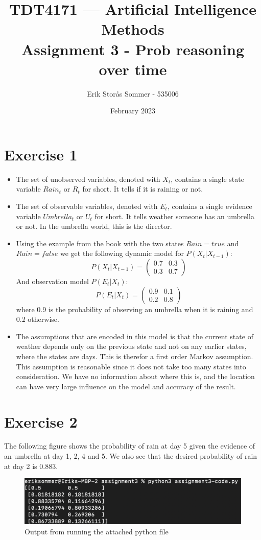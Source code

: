 \documentclass{article}
\title{TDT4171 — Artificial Intelligence Methods \\ Assignment 3 - Prob reasoning over time}
\author{Erik Storås Sommer - 535006}
\date{February 2023}
\begin{document}
\maketitle

\section*{Exercise 1}

\begin{itemize}
  \item The set of unobserved variables, denoted with \(X_t\), contains a single state variable \(Rain_t\) or \(R_t\) for short. It tells if it is raining or not.
  \item The set of observable variables, denoted with \(E_t\), contains a single evidence variable \(Umbrella_t\) or \(U_t\) for short. It tells weather someone has an umbrella or not. In the umbrella world, this is the director.
  \item Using the example from the book with the two states \(Rain=true\) and \(Rain=false\) we get the following dynamic model for \(P(X_t|X_{t-1})\):
  \[P(X_t|X_{t-1})= \begin{pmatrix} 0.7 & 0.3 \\ 0.3 & 0.7 \end{pmatrix}\]
  And observation model \(P(E_t|X_t)\):
  \[P(E_t|X_t)= \begin{pmatrix} 0.9 & 0.1 \\ 0.2 & 0.8 \end{pmatrix}\]
  where 0.9 is the probability of observing an umbrella when it is raining and 0.2 otherwise.
  \item The assumptions that are encoded in this model is that the current state of weather depends only on the previous state and not on any earlier states, where the states are days. This is therefor a first order Markov assumption. This assumption is reasonable since it does not take too many states into consideration. We have no information about where this is, and the location can have very large influence on the model and accuracy of the result.
\end{itemize}

\section*{Exercise 2}

The following figure shows the probability of rain at day 5 given the evidence of an umbrella at day 1, 2, 4 and 5. We also see that the desired probability of rain at day 2 is 0.883.

\begin{figure}[hbtp]
  \includegraphics[width=\linewidth]{output.png}
  \caption{Output from running the attached python file}
  \label{fig:boat1}
\end{figure}
\end{document}
